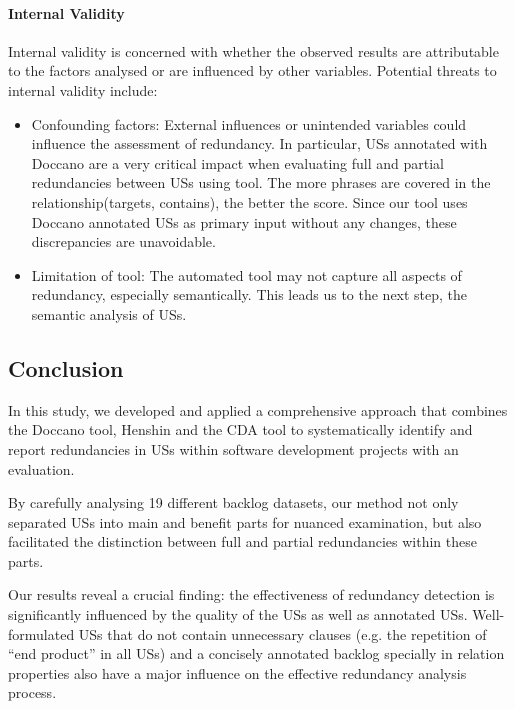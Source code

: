 \paragraph{Internal Validity}Internal validity is concerned with whether the observed results are attributable to the factors analysed or are influenced by other variables. Potential threats to internal validity include:
\begin{itemize}
	\item Confounding factors: External influences or unintended variables could influence the assessment of redundancy. In particular, USs annotated with Doccano are a very critical impact when evaluating full and partial redundancies between USs using tool. The more phrases are covered in the relationship(targets, contains), the better the score. Since our tool uses Doccano annotated USs as primary input without any changes, these discrepancies are unavoidable. %
	
	\item Limitation of tool: The automated tool may not capture all aspects of redundancy, especially semantically. This leads us to the next step, the semantic analysis of USs.
\end{itemize}
\subsection{Conclusion}\label{redundancy_conclustion}
In this study, we developed and applied a comprehensive approach that combines the Doccano tool, Henshin and the CDA tool to systematically identify and report redundancies in USs within software development projects with an evaluation.

By carefully analysing 19 different backlog datasets, our method not only separated USs into main and benefit parts for nuanced examination, but also facilitated the distinction between full and partial redundancies within these parts.

Our results reveal a crucial finding: the effectiveness of redundancy detection is significantly influenced by the quality of the USs as well as annotated USs. Well-formulated USs that do not contain unnecessary clauses (e.g. the repetition of \enquote{end product} in all USs) and a concisely annotated backlog specially in relation properties also have a major influence on the effective redundancy analysis process.

